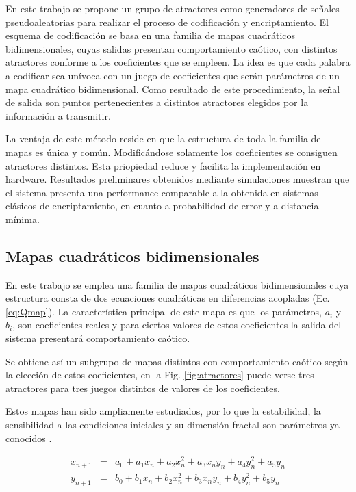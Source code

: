 En este trabajo se propone un grupo de atractores como generadores de señales
pseudoaleatorias para realizar el proceso de codificación y
encriptamiento. El esquema de codificación se basa
en una familia de mapas cuadráticos bidimensionales, cuyas salidas
presentan comportamiento caótico, con distintos atractores
conforme a los coeficientes que se empleen. La idea es que cada
palabra a codificar sea unívoca con un juego de coeficientes que
serán parámetros de un mapa cuadrático bidimensional. Como
resultado de este procedimiento, la señal de salida son puntos
pertenecientes a distintos atractores elegidos por la información
a transmitir.

La ventaja de este método reside en que la estructura de toda la
familia de mapas es única y común. Modificándose solamente los
coeficientes se consiguen atractores distintos. Esta priopiedad
reduce y facilita la implementación en hardware. Resultados
preliminares obtenidos mediante simulaciones muestran que el
sistema presenta una performance comparable a la obtenida en
sistemas clásicos de encriptamiento, en cuanto a probabilidad de
error y a distancia mínima.


\subsection{Mapas cuadráticos bidimensionales}


En este trabajo se emplea una familia de mapas cuadráticos
bidimensionales cuya estructura consta de dos ecuaciones
cuadráticas en diferencias acopladas (Ec.\ref{eq:Qmap}). La
característica principal de este mapa es que los parámetros, $a_i$
y $b_i$, son coeficientes reales y para ciertos valores de estos
coeficientes la salida del sistema presentará comportamiento
caótico.

Se obtiene así un subgrupo de mapas distintos con comportamiento
caótico según la elección de estos coeficientes, en la Fig.
\ref{fig:atractores} puede verse tres atractores para tres juegos
distintos de valores de los coeficientes.

Estos mapas han sido ampliamente estudiados, por lo que la
estabilidad, la sensibilidad a las condiciones iniciales y su
dimensión fractal son parámetros ya conocidos
\cite{Sprott2003,Sprott2000}.

\begin{eqnarray}\label{eq:Qmap}
    x_{n+1}&=& a_0 + a_1 x_n + a_2 x_n^2 + a_3 x_n y_n + a_4 y_n^2 + a_5 y_n \nonumber\\
    y_{n+1}&=& b_0 + b_1 x_n + b_2 x_n^2 + b_3 x_n y_n + b_4 y_n^2 + b_5 y_n
\end{eqnarray}

